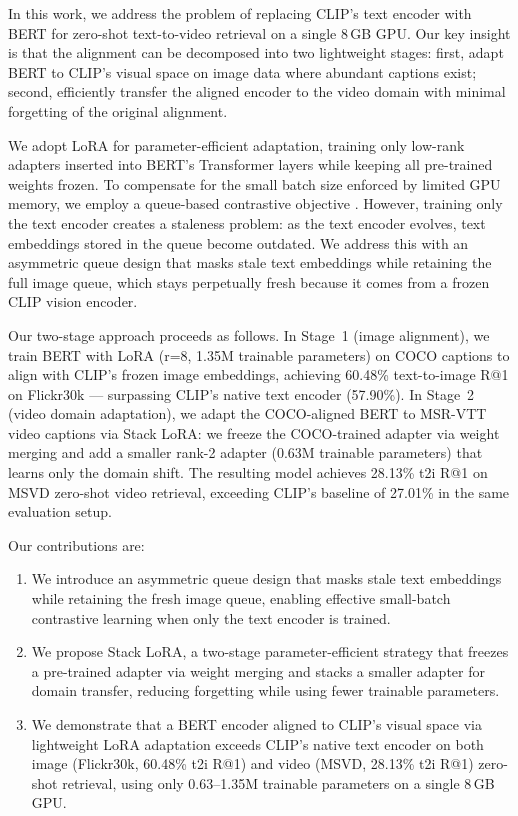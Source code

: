 \documentclass[10pt,leqno]{amsart}
\begin{document}
In this work, we address the problem of replacing CLIP's text encoder with BERT for zero-shot text-to-video retrieval on a single 8\,GB GPU. Our key insight is that the alignment can be decomposed into two lightweight stages: first, adapt BERT to CLIP's visual space on image data where abundant captions exist; second, efficiently transfer the aligned encoder to the video domain with minimal forgetting of the original alignment.

We adopt LoRA \citep{hu2022lora} for parameter-efficient adaptation, training only low-rank adapters inserted into BERT's Transformer layers while keeping all pre-trained weights frozen. To compensate for the small batch size enforced by limited GPU memory, we employ a queue-based contrastive objective \citep{he2020moco}. However, training only the text encoder creates a staleness problem: as the text encoder evolves, text embeddings stored in the queue become outdated. We address this with an asymmetric queue design that masks stale text embeddings while retaining the full image queue, which stays perpetually fresh because it comes from a frozen CLIP vision encoder.

Our two-stage approach proceeds as follows. In Stage~1 (image alignment), we train BERT with LoRA (r=8, 1.35M trainable parameters) on COCO captions to align with CLIP's frozen image embeddings, achieving 60.48\% text-to-image R@1 on Flickr30k --- surpassing CLIP's native text encoder (57.90\%). In Stage~2 (video domain adaptation), we adapt the COCO-aligned BERT to MSR-VTT video captions via Stack LoRA: we freeze the COCO-trained adapter via weight merging and add a smaller rank-2 adapter (0.63M trainable parameters) that learns only the domain shift. The resulting model achieves 28.13\% t2i R@1 on MSVD zero-shot video retrieval, exceeding CLIP's baseline of 27.01\% in the same evaluation setup.

Our contributions are:

\begin{enumerate}
    \item We introduce an asymmetric queue design that masks stale text embeddings while retaining the fresh image queue, enabling effective small-batch contrastive learning when only the text encoder is trained.
    \item We propose Stack LoRA, a two-stage parameter-efficient strategy that freezes a pre-trained adapter via weight merging and stacks a smaller adapter for domain transfer, reducing forgetting while using fewer trainable parameters.
    \item We demonstrate that a BERT encoder aligned to CLIP's visual space via lightweight LoRA adaptation exceeds CLIP's native text encoder on both image (Flickr30k, 60.48\% t2i R@1) and video (MSVD, 28.13\% t2i R@1) zero-shot retrieval, using only 0.63--1.35M trainable parameters on a single 8\,GB GPU.
\end{enumerate}
\end{document}
